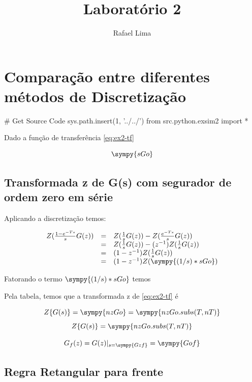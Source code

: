 \documentclass[a4paper,11pt]{article}
\title{Laboratório 2} %
\author{Rafael Lima}
\begin{document}

\section{Comparação entre diferentes métodos de Discretização}

\begin{sympycode}
# Get Source Code
sys.path.insert(1, '../../')
from src.python.exsim2 import *
\end{sympycode}

Dado a função de transferência \ref{eq:ex2-tf}

\begin{equation}\label{eq:ex2-tf}
\sympy{sGo}
\end{equation}

\subsection{Transformada z de G(s) com segurador de ordem zero em série}

Aplicando a discretização temos:

$$
\begin{array}{lcl}
    Z(\frac{1-e^{-Ts}}{s}G(z)) &=& Z(\frac{1}{s}G(z)) - Z(\frac{e^{-Ts}}{s}G(z))\\
    &=& Z(\frac{1}{s}G(z)) - (z^{-1})Z(\frac{1}{s}G(z))\\
    &=& (1 - z^{-1})Z(\frac{1}{s}G(z))\\
    &=& (1 - z^{-1})Z(\sympy{(1/s)*sGo})\\
\end{array}
$$

Fatorando o termo $\sympy{(1/s)*sGo}$ temos



Pela tabela, temos que a transformada z de \ref{eq:ex2-tf} é

$$Z\{G(s)\} = \sympy{nzGo} = \sympy{nzGo.subs(T,nT)}$$
$$Z\{G(s)\} = \sympy{nzGo.subs(T,nT)}$$


\begin{equation}
  G_f(z) =  G(z)|_{s = \sympy{Gzf}} = \sympy{Gof}
\end{equation}

\subsection{Regra Retangular para frente}
\end{document}
